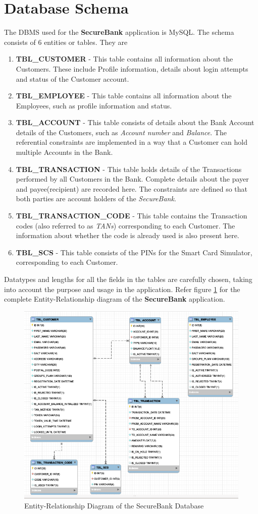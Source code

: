 \section{Database Schema}

The DBMS used for the \textbf{SecureBank} application is MySQL. The schema consists of 6 entities or tables. They are 
\begin{enumerate}
\item \textbf{TBL\_CUSTOMER} - This table contains all information about the Customers. These include Profile information, details about login attempts and status of the Customer account.
\item \textbf{TBL\_EMPLOYEE} - This table contains all information about the Employees, such as profile information and status. 
\item \textbf{TBL\_ACCOUNT} - This table consists of details about the Bank Account details of the Customers, such as \textit{Account number} and \textit{Balance}. The referential constraints are implemented in a way that a Customer can hold multiple Accounts in the Bank. 
\item \textbf{TBL\_TRANSACTION} - This table holds details of the Transactions performed by all Customers in the Bank. Complete details about the payer and payee(recipient) are recorded here. The constraints are defined so that both parties are account holders of the \textit{SecureBank}.
\item \textbf{TBL\_TRANSACTION\_CODE} - This table contains the Transaction codes (also referred to as \textit{TANs}) corresponding to each Customer. The information about whether the code is already used is also present here.
\item \textbf{TBL\_SCS} - This table consists of the PINs for the Smart Card Simulator, corresponding to each Customer.
\end{enumerate}

Datatypes and lengths for all the fields in the tables are carefully chosen, taking into account the purpose and usage in the application. Refer figure \ref{fig:db_schema} for the complete Entity-Relationship diagram of the \textbf{SecureBank} application.

\begin{figure}[ht]
	\centering
	\includegraphics[width=.8\linewidth]{figures/db_schema.png}
	\caption{Entity-Relationship Diagram of the SecureBank Database}
	\label{fig:db_schema}
\end{figure}
